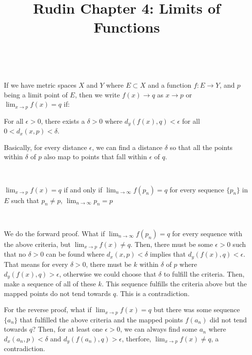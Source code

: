 \documentclass{article}
\title{Rudin Chapter 4: Limits of Functions}
\begin{document}
\maketitle

\begin{definition}
\

If we have metric spaces $X$ and $Y$ where $E \subset X$ and a function $f : E \to Y$, and $p$ being a limit point of $E$, then we write $f(x) \to q$ as $x \to p$ or $\lim_{x \to p} f(x) = q$ if:

For all $\epsilon > 0$, there exists a $\delta > 0$ where $d_y(f(x), q) < \epsilon$ for all $0 < d_x(x, p) < \delta$. 

Basically, for every distance $\epsilon$, we can find a distance $\delta$ so that all the points within $\delta$ of $p$ also map to points that fall within $\epsilon$ of $q$. 
\end{definition}

\begin{theorem}
\

$\lim_{x \to p} f(x) = q$ if and only if $\lim_{n \to \infty} f(p_n) = q$ for every sequence $\{p_n\}$ in $E$ such that $p_n \neq p$, $\lim_{n \to \infty} p_n = p$
\end{theorem}

\begin{customproof}
\

We do the forward proof. What if $\lim_{n\to \infty} f(p_n) = q$ for every sequence with the above criteria, but $\lim_{x \to p} f(x) \neq q$. Then, there must be some $\epsilon > 0$ such that no $\delta > 0$ can be found where $d_x(x,p ) < \delta$ implies that $d_y(f(x), q) < \epsilon$. That means for every $\delta > 0$, there must be $k$ within $\delta$ of $p$ where $d_y(f(x), q) > \epsilon$, otherwise we could choose that $\delta$ to fulfill the criteria. Then, make a sequence of all of these $k$. This sequence fulfills the criteria above but the mapped points do not tend towards $q$. This is a contradiction.

For the reverse proof, what if $\lim_{x\to p} f(x) = q$ but there was some sequence $\{a_n\}$ that fulfilled the above criteria and the mapped points $f(a_n)$ did not tend towards $q$? Then, for at least one $\epsilon > 0$, we can always find some $a_n$ where $d_x(a_n, p) < \delta$ and $d_y(f(a_n), q) > \epsilon$, therfore, $\lim_{x\to p} f(x) \neq q$, a contradiction. 
\end{customproof}
\end{document}
